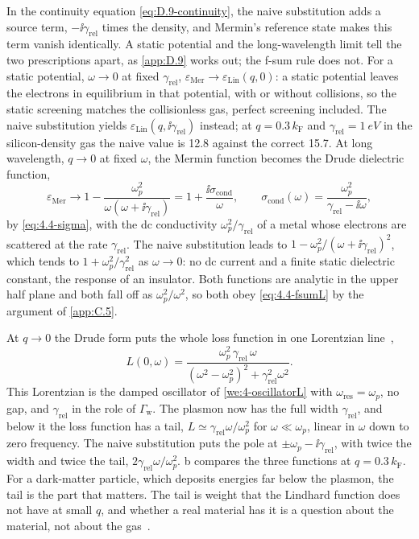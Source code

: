 In the continuity equation \cref{eq:D.9-continuity}, the naive substitution adds a source term, $-\ii\gamma_{\mathrm{rel}}$ times the density, and Mermin's reference state makes this term vanish identically. A static potential and the long-wavelength limit tell the two prescriptions apart, as \cref{app:D.9} works out; the f-sum rule does not. For a static potential, $\omega \to 0$ at fixed $\gamma_{\mathrm{rel}}$, $\varepsilon_{\mathrm{Mer}} \to \varepsilon_{\mathrm{Lin}}(q, 0)$: a static potential leaves the electrons in equilibrium in that potential, with or without collisions, so the static screening matches the collisionless gas, perfect screening included. The naive substitution yields $\varepsilon_{\mathrm{Lin}}(q, \ii\gamma_{\mathrm{rel}})$ instead; at $q = 0.3\,k_{\mathrm{F}}$ and $\gamma_{\mathrm{rel}} = \SI{1}{eV}$ in the silicon-density gas the naive value is 12.8 against the correct 15.7. At long wavelength, $q \to 0$ at fixed $\omega$, the Mermin function becomes the Drude dielectric function,
\begin{equation*}
  \varepsilon_{\mathrm{Mer}} \to 1 - \frac{\omega_p^2}{\omega(\omega + \ii\gamma_{\mathrm{rel}})} = 1 + \frac{\ii\sigma_{\mathrm{cond}}}{\omega}, \qquad
  \sigma_{\mathrm{cond}}(\omega) = \frac{\omega_p^2}{\gamma_{\mathrm{rel}} - \ii\omega} ,
\end{equation*}
by \cref{eq:4.4-sigma}, with the dc conductivity $\omega_p^2/\gamma_{\mathrm{rel}}$ of a metal whose electrons are scattered at the rate $\gamma_{\mathrm{rel}}$. The naive substitution leads to $1 - \omega_p^2/(\omega + \ii\gamma_{\mathrm{rel}})^2$, which tends to $1 + \omega_p^2/\gamma_{\mathrm{rel}}^2$ as $\omega \to 0$: no dc current and a finite static dielectric constant, the response of an insulator. Both functions are analytic in the upper half plane and both fall off as $\omega_p^2/\omega^2$, so both obey \cref{eq:4.4-fsumL} by the argument of \cref{app:C.5}.

At $q \to 0$ the Drude form puts the whole loss function in one Lorentzian line~\cite[Eq.~(172)]{kahn2022searches},
\begin{equation*}
  L(0,\omega) = \frac{\omega_p^2\,\gamma_{\mathrm{rel}}\,\omega}{(\omega^2 - \omega_p^2)^2 + \gamma_{\mathrm{rel}}^2\omega^2} .
\end{equation*}
This Lorentzian is the damped oscillator of \cref{we:4-oscillatorL} with $\omega_{\mathrm{res}} = \omega_p$, no gap, and $\gamma_{\mathrm{rel}}$ in the role of $\varGamma_{\mathrm{w}}$. The plasmon now has the full width $\gamma_{\mathrm{rel}}$, and below it the loss function has a tail, $L \simeq \gamma_{\mathrm{rel}}\omega/\omega_p^2$ for $\omega \ll \omega_p$, linear in $\omega$ down to zero frequency. The naive substitution puts the pole at $\pm\omega_p - \ii\gamma_{\mathrm{rel}}$, with twice the width and twice the tail, $2\gamma_{\mathrm{rel}}\omega/\omega_p^2$. b compares the three functions at $q = 0.3\,k_{\mathrm{F}}$. For a dark-matter particle, which deposits energies far below the plasmon, the tail is the part that matters. The tail is weight that the Lindhard function does not have at small $q$, and whether a real material has it is a question about the material, not about the gas~\cite{hochberg2021determining,kahn2022searches}.

